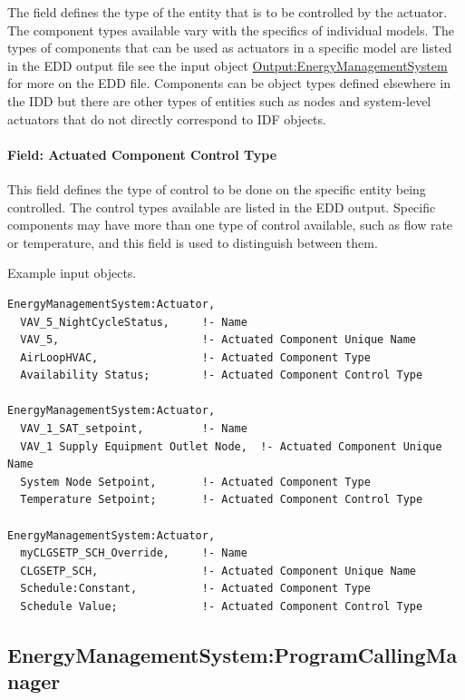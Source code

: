 The field defines the type of the entity that is to be controlled by the actuator. The component types available vary with the specifics of individual models. The types of components that can be used as actuators in a specific model are listed in the EDD output file see the input object \hyperref[outputenergymanagementsystem]{Output:EnergyManagementSystem} for more on the EDD file. Components can be object types defined elsewhere in the IDD but there are other types of entities such as nodes and system-level actuators that do not directly correspond to IDF objects.

\paragraph{Field: Actuated Component Control Type}\label{field-actuated-component-control-type}

This field defines the type of control to be done on the specific entity being controlled. The control types available are listed in the EDD output. Specific components may have more than one type of control available, such as flow rate or temperature, and this field is used to distinguish between them.

Example input objects.

\begin{lstlisting}
EnergyManagementSystem:Actuator,
  VAV_5_NightCycleStatus,     !- Name
  VAV_5,                      !- Actuated Component Unique Name
  AirLoopHVAC,                !- Actuated Component Type
  Availability Status;        !- Actuated Component Control Type

EnergyManagementSystem:Actuator,
  VAV_1_SAT_setpoint,         !- Name
  VAV_1 Supply Equipment Outlet Node,  !- Actuated Component Unique Name
  System Node Setpoint,       !- Actuated Component Type
  Temperature Setpoint;       !- Actuated Component Control Type

EnergyManagementSystem:Actuator,
  myCLGSETP_SCH_Override,     !- Name
  CLGSETP_SCH,                !- Actuated Component Unique Name
  Schedule:Constant,          !- Actuated Component Type
  Schedule Value;             !- Actuated Component Control Type
\end{lstlisting}

\subsection{EnergyManagementSystem:ProgramCallingManager}\label{energymanagementsystemprogramcallingmanager}

